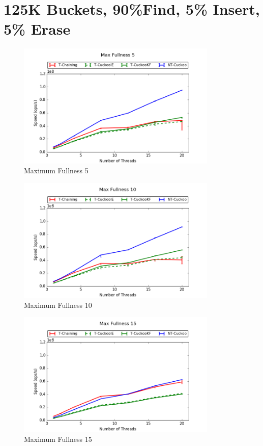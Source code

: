\section{125K Buckets, 90\%Find, 5\% Insert, 5\% Erase}
\begin{figure}[H]
    \centering
	\includegraphics[width=0.85\textwidth]{maps/5HM125K:F90,I5,E5.png} 
        \caption*{Maximum Fullness 5}
\end{figure}
\begin{figure}[H]
    \centering
	\includegraphics[width=0.85\textwidth]{maps/10HM125K:F90,I5,E5.png} 
        \caption*{Maximum Fullness 10}
\end{figure}
\begin{figure}[H]
    \centering
	\includegraphics[width=0.85\textwidth]{maps/15HM1M:F90,I5,E5.png} 
        \caption*{Maximum Fullness 15}
\end{figure}


